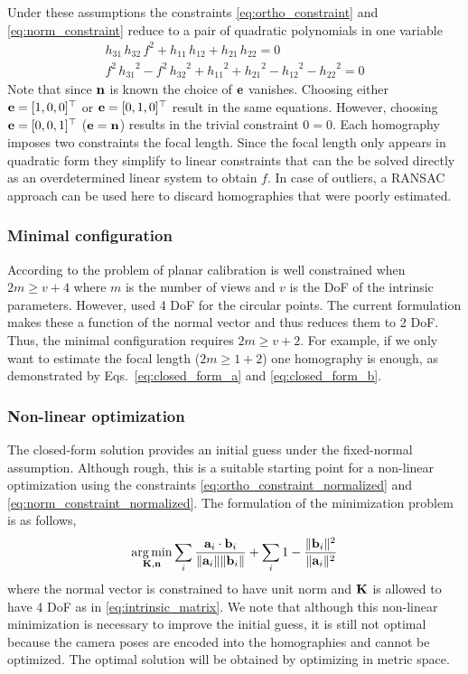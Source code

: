 \documentclass[10pt,twocolumn,letterpaper]{article}
\begin{document}
Under these assumptions the constraints \eqref{eq:ortho_constraint} and \eqref{eq:norm_constraint} reduce to a pair of quadratic polynomials in one variable 
\begin{align}
h_{31}\, h_{32}\, f^2 + h_{11}\, h_{12} + h_{21}\, h_{22}=0
\label{eq:closed_form_a}
\\
f^2\, {h_{31}}^2 - f^2\, {h_{32}}^2 + {h_{11}}^2 + {h_{21}}^2 - {h_{12}}^2 - {h_{22}}^2=0
\label{eq:closed_form_b}
\end{align}
Note that since $\mathbf{n}$ is known the choice of $\mathbf{e}$ vanishes. Choosing either $\mathbf{e}=[1,0,0]^\top$ or $\mathbf{e}=[0,1,0]^\top$ result in the same equations. However, choosing $\mathbf{e}=[0,0,1]^\top$ (\ie $\mathbf{e}=\mathbf{n}$) results in the trivial constraint $0=0$. Each homography imposes two constraints the focal length. Since the focal length only appears in quadratic form they simplify to linear constraints that can the be solved directly as an overdetermined linear system to obtain $f$. In case of outliers, a RANSAC approach can be used here to discard homographies that were poorly estimated.

\subsubsection{Minimal configuration}

According to \cite{hartley2000} the problem of planar calibration is well constrained when $2m \geq v+4$ where $m$ is the number of views and $v$ is the DoF of the intrinsic parameters. However, \cite{hartley2000} used 4 DoF for the circular points. The current formulation makes these a function of the normal vector and thus reduces them to 2 DoF. Thus, the minimal configuration requires $2m \geq v+2$. For example, if we only want to estimate the focal length ($2m \geq 1+2$) one homography is enough, as demonstrated by Eqs.~\eqref{eq:closed_form_a} and \eqref{eq:closed_form_b}.

\subsubsection{Non-linear optimization}

The closed-form solution provides an initial guess under the fixed-normal assumption. Although rough, this is a suitable starting point for a non-linear optimization using the constraints \eqref{eq:ortho_constraint_normalized} and \eqref{eq:norm_constraint_normalized}. The formulation of the minimization problem is as follows, 
%
\begin{align}
\operatorname*{arg\,min}_{\mathbf{K},\mathbf{n}} 
\sum_i 
\frac{\mathbf{a}_i \cdot \mathbf{b}_i}{\lVert\mathbf{a}_i\rVert \lVert\mathbf{b}_i\rVert} +
\sum_i 
1 - \frac{\lVert\mathbf{b}_i\rVert^2}{\lVert\mathbf{a}_i\rVert^2}
\label{eq:calib_ba}
\end{align}
%
where the normal vector is constrained to have unit norm and $\mathbf{K}$ is allowed to have 4 DoF as in \eqref{eq:intrinsic_matrix}. We note that although this non-linear minimization is necessary to improve the initial guess, it is still not optimal because the camera poses are encoded into the homographies and cannot be optimized. The optimal solution will be obtained by optimizing in metric space.
\end{document}
